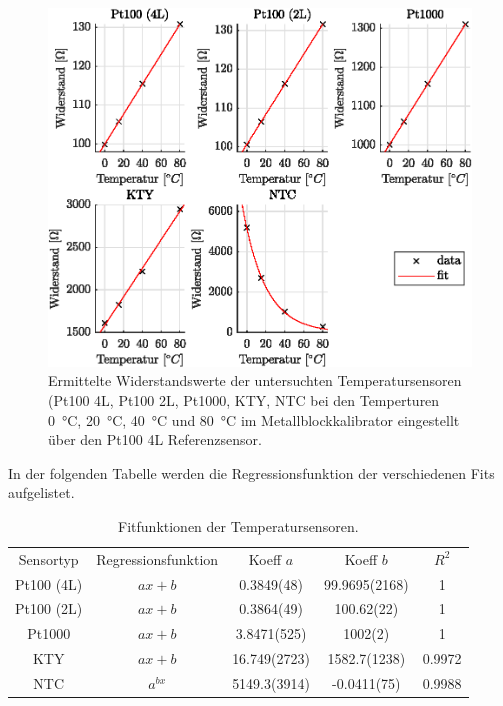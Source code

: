 \begin{figure}[H]
	\centering
	\includegraphics[height=0.25\textheight]{../MLAB/Widerstandsgeraden.eps}
	\caption[Ermittelte Widerstandswerte der untersuchten Temperatursensoren ]{Ermittelte Widerstandswerte der untersuchten Temperatursensoren (Pt100 4L, Pt100 2L, Pt1000, KTY, NTC bei den Temperturen \SI{0}{\celsius}, \SI{20}{\celsius}, \SI{40}{\celsius} und \SI{80}{\celsius} im Metallblockkalibrator eingestellt über den Pt100 4L Referenzsensor. }
	\label{fig:Widerstand}
\end{figure}

In der folgenden Tabelle werden die Regressionsfunktion der verschiedenen Fits aufgelistet. 
\begin{table}[H]
	\centering
	\caption{Fitfunktionen der Temperatursensoren.}
	\label{tab:FitFun}
	\begin{tabular}{ccS[separate-uncertainty,table-parse-only,table-figures-uncertainty = 1]S[separate-uncertainty,table-parse-only,table-figures-uncertainty = 1]S}
		
		Sensortyp & Regressionsfunktion & {Koeff $a$} & {Koeff $b$} & {$R^2$} \\
		
		Pt100 (4L) & $ax+b$ & 0.3849(48) & 99.9695(2168) & 1 \\
		Pt100 (2L) & $ax+b$ & 0.3864(49) & 100.62(22) & 1 \\
		Pt1000 & $ax+b$ & 3.8471(525) & 1002(2) & 1 \\
		KTY & $ax+b$ & 16.749(2723) & 1582.7(1238) & 0.9972 \\
		NTC & $a^{bx}$ & 5149.3(3914) & -0.0411(75) & 0.9988 \\
		
	\end{tabular} 
\end{table}

